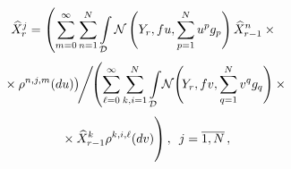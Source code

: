 \begin{multicols}{2}
  \noindent
  \begin{multline} 
  \widehat{X}_r^{j} = \left(
\sum\limits_{m=0}^{\infty}
    \sum\limits_{n=1}^N \int\limits_{\mathcal{D}} 
 \mathcal{N}\left(Y_{r},f u,\sum\limits_{p=1}^N u^p g_p\right)
  \widehat{X}_{r-1}^n\times{}\right.\\[3pt]
\left. {}\times  
 \rho^{n,j,m}(du)\right)\!\!\Bigg/ \!\!
 \left( 
 \sum\limits_{\ell=0}^{\infty}\sum\limits_{k,i=1}^N \int\limits_{\mathcal{D}} 
 \!\mathcal{N}\!\left(\!Y_{r},f v,\sum\limits_{q=1}^N v^q g_q\right)\times{}\right.\hspace*{-1.15286pt}\\[3pt]
 \left.{}\times  \widehat{X}_{r-1}^k
 \rho^{k,i,\ell}(dv)
  \vphantom{\int\limits_{\mathcal{D}}}
 \right), \enskip j=\overline{1,N}\,,
  \label{eq:filt_1}
 \end{multline}


\end{multicols}
